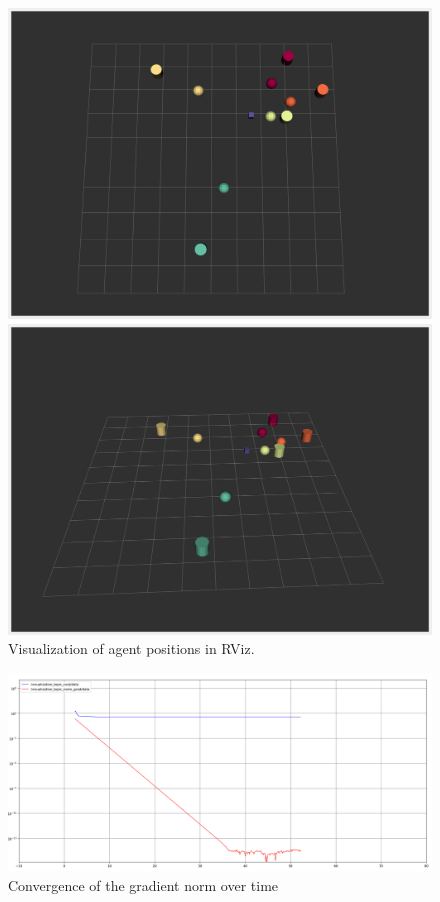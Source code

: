 \begin{figure}[H]
  \begin{minipage}{0.45\textwidth}
    \includegraphics[width=\linewidth]{report/figs/result_rviz.png}
  \end{minipage}%
  \hfill
  \begin{minipage}{0.45\textwidth}
    \includegraphics[width=\linewidth]{report/figs/rviz_result_2.png}
  \end{minipage}%
  \caption{Visualization of agent positions in RViz.}
  \label{fig:rviz_result}
\end{figure}

\begin{figure}[H]
    \centering
    \includegraphics[width=0.7\linewidth]{report/figs/plot_cost_norm.png}
    \caption{Convergence of the gradient norm over time}
    \label{fig:rqt_plot}
\end{figure}

